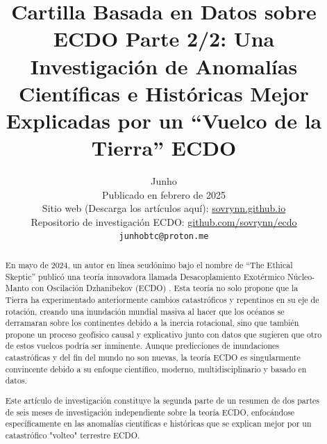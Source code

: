 \documentclass[10pt,twocolumn,letterpaper]{article}
\begin{document}
\title{Cartilla Basada en Datos sobre ECDO Parte 2/2: Una Investigación de Anomalías Científicas e Históricas Mejor Explicadas por un “Vuelco de la Tierra” ECDO}

\author{Junho\\
Publicado en febrero de 2025\\
Sitio web (Descarga los artículos aquí): \href{https://sovrynn.github.io}{sovrynn.github.io}\\
Repositorio de investigación ECDO: \href{https://github.com/sovrynn/ecdo}{github.com/sovrynn/ecdo}\\
{\tt\small junhobtc@proton.me}
}

\maketitle

\begin{abstract}
En mayo de 2024, un autor en línea seudónimo bajo el nombre de “The Ethical Skeptic” \cite{0} publicó una teoría innovadora llamada Desacoplamiento Exotérmico Núcleo-Manto con Oscilación Dzhanibekov (ECDO) \cite{1}. Esta teoría no solo propone que la Tierra ha experimentado anteriormente cambios catastróficos y repentinos en su eje de rotación, creando una inundación mundial masiva al hacer que los océanos se derramaran sobre los continentes debido a la inercia rotacional, sino que también propone un proceso geofísico causal y explicativo junto con datos que sugieren que otro de estos vuelcos podría ser inminente. Aunque predicciones de inundaciones catastróficas y del fin del mundo no son nuevas, la teoría ECDO es singularmente convincente debido a su enfoque científico, moderno, multidisciplinario y basado en datos.

Este artículo de investigación constituye la segunda parte de un resumen de dos partes de seis meses de investigación independiente \cite{2,20} sobre la teoría ECDO, enfocándose específicamente en las anomalías científicas e históricas que se explican mejor por un catastrófico "volteo" terrestre ECDO.

\end{abstract}
\end{document}
